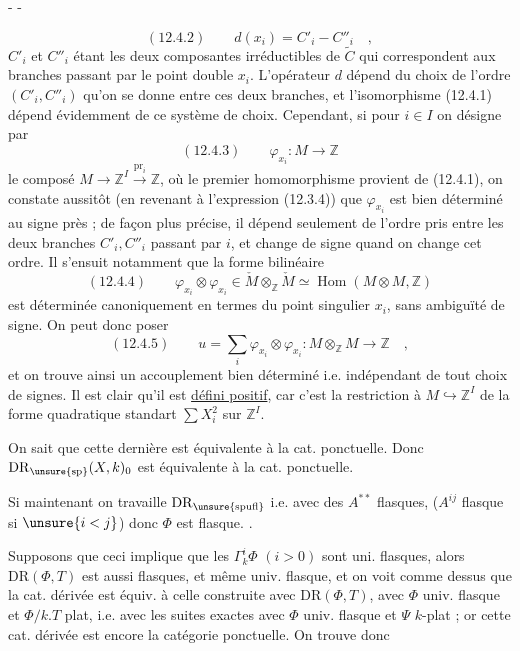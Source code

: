 \begin{center}-  -\end{center}
\[
(12.4.2)\qquad d(x_i)=C'_i-C''_i\quad,
\]
$C'_i$ et $C''_i$ étant les deux composantes irréductibles de $\widetilde C$ qui correspondent aux branches passant par le point double $x_i$. L'opérateur $d$ dépend du choix de l'ordre $(C'_i,C''_i)$ qu'on se donne entre ces deux branches, et l'isomorphisme (12.4.1) dépend évidemment de ce système de choix. Cependant, si pour $i\in I$ on désigne par
\[
(12.4.3)\qquad\varphi_{x_i}:M\longrightarrow\mathbb Z
\]
le composé $M\longrightarrow\mathbb Z^I\xrightarrow{\mathrm{pr}_i}\mathbb Z$, où le premier homomorphisme provient de (12.4.1), on constate aussitôt (en revenant à l'expression (12.3.4)) que $\varphi_{x_i}$ est bien déterminé au signe près ; de façon plus précise, il dépend seulement de l'ordre pris entre les deux branches $C'_i,C''_i$ passant par $i$, et change de signe quand on change cet ordre. Il s'ensuit notamment que la forme bilinéaire
\[
(12.4.4)\qquad\varphi_{x_i}\otimes\varphi_{x_i}\in\check M\otimes_{\mathbb Z}\check M\simeq\operatorname{Hom}(M\otimes M,\mathbb Z)
\]
est déterminée canoniquement en termes du point singulier $x_i$, sans ambiguïté de signe. On peut donc poser
\[
(12.4.5)\qquad u=\sum_i\varphi_{x_i}\otimes\varphi_{x_i}:M\otimes_{\mathbb Z}M\longrightarrow\mathbb Z\quad,
\]
et on trouve ainsi un accouplement bien déterminé i.e. indépendant de tout choix de signes. Il est clair qu'il est \uline{défini positif}, car c'est la restriction à $M\hookrightarrow\mathbb Z^I$ de la forme quadratique standart $\sum X_i^2$ sur $\mathbb Z^I$.


On sait que cette dernière est équivalente à la cat. ponctuelle. Donc $\mathrm{DR}_{\unsure{\mathrm{sp}}}(X,k)_0$ est équivalente à la cat. ponctuelle.

Si maintenant on travaille  $\mathrm{DR}_{\unsure{\mathrm{spufl}}}$  i.e. avec des $A^{**}$  flasques, ($A^{ij}$  flasque si $\unsure{i<j}$) donc $\Phi$ est  flasque.
.

Supposons que ceci implique que les $\Gamma_k^i\Phi$ $(i>0)$ sont uni. flasques, alors $\mathrm{DR}(\Phi,T)$ est aussi flasques,  et même univ. flasque, et on voit comme dessus que la cat. dérivée est équiv. à celle construite avec  $\mathrm{DR}(\Phi,T)$, avec $\Phi$ univ. flasque et $\Phi/k.T$ plat, i.e. avec les suites exactes
avec $\Phi$ univ. flasque et $\Psi$ $k$-plat ; or cette cat. dérivée est encore la catégorie ponctuelle. On trouve donc

